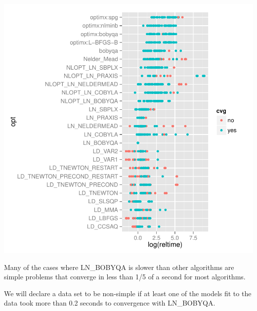 \documentclass[article]{jss}
\begin{document}
\begin{Schunk}
\end{Schunk}
\includegraphics{Paper-013}






Many of the cases where LN_BOBYQA is slower than other algorithms are simple problems that converge in less than 1/5 of a second for most algorithms.

We will declare a data set to be non-simple if at least one of the models fit to the data took more than 0.2 seconds to convergence with LN_BOBYQA.
\end{document}
